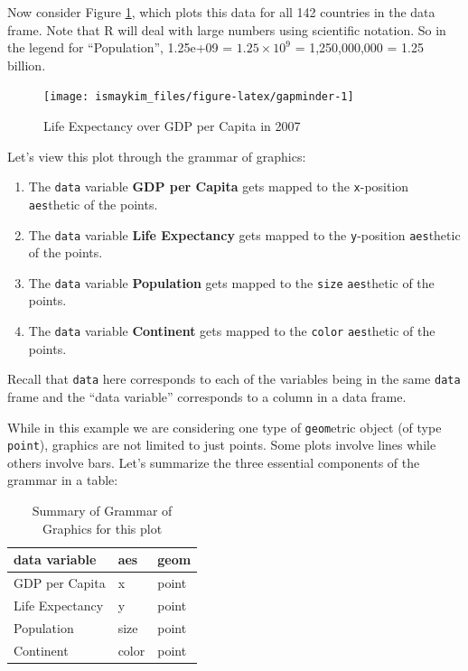 \documentclass[12pt,]{krantz}
\providecommand{\tightlist}{%
  \setlength{\itemsep}{0pt}\setlength{\parskip}{0pt}}
\theoremstyle{definition}
\theoremstyle{definition}
\theoremstyle{definition}
\theoremstyle{remark}
\begin{document}
Now consider Figure \ref{fig:gapminder}, which plots this data for all
142 countries in the data frame. Note that R will deal with large
numbers using scientific notation. So in the legend for ``Population'',
1.25e+09 = \(1.25 \times 10^{9}\) = 1,250,000,000 = 1.25 billion.

\begin{figure}

{\centering \texttt{[image: ismaykim\_files/figure-latex/gapminder-1]} 

}

\caption{Life Expectancy over GDP per Capita in 2007}\label{fig:gapminder}
\end{figure}

Let's view this plot through the grammar of graphics:

\begin{enumerate}
\def\labelenumi{\arabic{enumi}.}
\tightlist
\item
  The \texttt{data} variable \textbf{GDP per Capita} gets mapped to the
  \texttt{x}-position \texttt{aes}thetic of the points.
\item
  The \texttt{data} variable \textbf{Life Expectancy} gets mapped to the
  \texttt{y}-position \texttt{aes}thetic of the points.
\item
  The \texttt{data} variable \textbf{Population} gets mapped to the
  \texttt{size} \texttt{aes}thetic of the points.
\item
  The \texttt{data} variable \textbf{Continent} gets mapped to the
  \texttt{color} \texttt{aes}thetic of the points.
\end{enumerate}

Recall that \texttt{data} here corresponds to each of the variables
being in the same \texttt{data} frame and the ``data variable''
corresponds to a column in a data frame.

While in this example we are considering one type of \texttt{geom}etric
object (of type \texttt{point}), graphics are not limited to just
points. Some plots involve lines while others involve bars. Let's
summarize the three essential components of the grammar in a table:

\begin{table}[H]

\caption{\label{tab:unnamed-chunk-17}Summary of Grammar of Graphics for this plot}
\centering
\fontsize{10}{12}\selectfont
\begin{tabular}[t]{lll}
\toprule
data variable & aes & geom\\
\midrule
GDP per Capita & x & point\\
Life Expectancy & y & point\\
Population & size & point\\
Continent & color & point\\
\bottomrule
\end{tabular}
\end{table}
\end{document}
